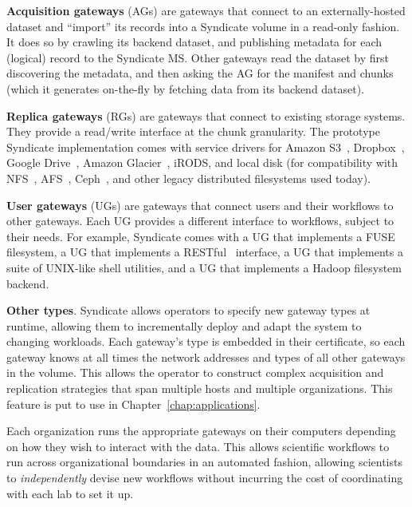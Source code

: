 \textbf{Acquisition gateways} (AGs) are gateways that connect to an externally-hosted
dataset and ``import'' its records into a Syndicate volume in a read-only
fashion.  It does so by crawling its backend dataset, and publishing metadata
for each (logical) record to the Syndicate MS.  Other gateways read the dataset
by first discovering the metadata, and then asking the AG for the manifest and
chunks (which it generates on-the-fly by fetching data from its backend
dataset).

\textbf{Replica gateways} (RGs) are gateways that connect to existing storage
systems.  They provide a read/write interface at the chunk granularity.
The prototype Syndicate implementation comes with service drivers for Amazon S3~\cite{s3}, Dropbox~\cite{dropbox},
Google Drive~\cite{google-drive}, Amazon Glacier~\cite{amazon-glacier}, iRODS,
and local disk (for compatibility with NFS~\cite{nfs}, AFS~\cite{afs},
Ceph~\cite{ceph}, and other legacy distributed filesystems used today).

\textbf{User gateways} (UGs) are gateways that connect users and their workflows
to other gateways.  Each UG provides a different interface to workflows, subject
to their needs.  For example, Syndicate comes with a UG that implements a
FUSE~\cite{fuse} filesystem, a UG that implements a RESTful~\cite{rest}
interface, a UG that implements a suite of UNIX-like shell utilities, and a UG
that implements a Hadoop filesystem~\cite{hadoop} backend.

\textbf{Other types}.  Syndicate allows operators to specify new gateway types at runtime, allowing
them to incrementally deploy and adapt the system to changing workloads.  Each
gateway's type is embedded in their certificate, so each gateway knows at all
times the network addresses and types of all other gateways in the volume.
This allows the operator to construct complex acquisition and replication
strategies that span multiple hosts and multiple organizations.
This feature is put to use in Chapter~\ref{chap:applications}.

Each organization runs the appropriate gateways on their computers depending on
how they wish to interact with the data.  This allows scientific workflows to
run across organizational boundaries in an automated fashion, allowing
scientists to \emph{independently} devise new workflows without incurring the
cost of coordinating with each lab to set it up.

